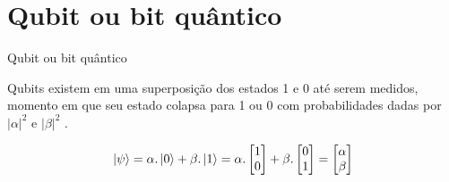 	\section{Qubit ou bit quântico}

	\begin{frame}[allowframebreaks]{Qubit ou bit quântico}
		\par Qubits existem em uma superposição dos estados 1 e 0 até serem medidos, momento em que seu estado colapsa para 1 ou 0 com probabilidades dadas por $|\alpha|^ 2$ e $|\beta|^2$ \cite{da2018introduccao}.
		
		\begin{equation}
			\ket{\psi} = \alpha . \ket{0} + \beta . \ket{1} = 
			\alpha . \begin{bmatrix}
				1 \\
				0
			\end{bmatrix} + \beta .	\begin{bmatrix}
				0 \\
				1
			\end{bmatrix} = 
			\begin{bmatrix}
				\alpha \\
				\beta
			\end{bmatrix}
			\label{eq:qubit}
		\end{equation}
	

\end{frame}

